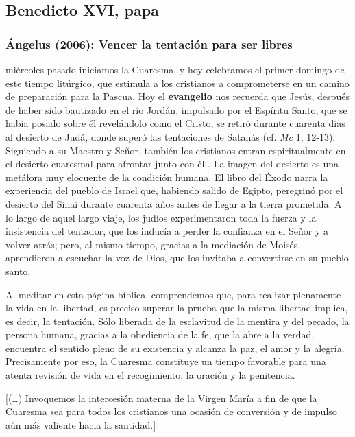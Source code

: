 \newsection
\subsection{Benedicto XVI, papa}

\subsubsection{Ángelus (2006): Vencer la tentación para ser libres}


\begin{body}
 miércoles pasado iniciamos la Cuaresma, y hoy celebramos el primer domingo de este tiempo litúrgico, que estimula a los cristianos a comprometerse en un camino de preparación para la Pascua. Hoy el \textbf{evangelio} nos recuerda que Jesús, después de haber sido bautizado en el río Jordán, impulsado por el Espíritu Santo, que se había posado sobre él revelándolo como el Cristo, se retiró durante cuarenta días al desierto de Judá, donde superó las tentaciones de Satanás (cf. \textit{Mc} 1, 12-13). Siguiendo a su Maestro y Señor, también los cristianos entran espiritualmente en el desierto cuaresmal para afrontar junto con él . La imagen del desierto es una metáfora muy elocuente de la condición humana. El libro del Éxodo narra la experiencia del pueblo de Israel que, habiendo salido de Egipto, peregrinó por el desierto del Sinaí durante cuarenta años antes de llegar a la tierra prometida. A lo largo de aquel largo viaje, los judíos experimentaron toda la fuerza y la insistencia del tentador, que los inducía a perder la confianza en el Señor y a volver atrás; pero, al mismo tiempo, gracias a la mediación de Moisés, aprendieron a escuchar la voz de Dios, que los invitaba a convertirse en su pueblo santo.

Al meditar en esta página bíblica, comprendemos que, para realizar plenamente la vida en la libertad, es preciso superar la prueba que la misma libertad implica, es decir, la tentación. Sólo liberada de la esclavitud de la mentira y del pecado, la persona humana, gracias a la obediencia de la fe, que la abre a la verdad, encuentra el sentido pleno de su existencia y alcanza la paz, el amor y la alegría. Precisamente por eso, la Cuaresma constituye un tiempo favorable para una atenta revisión de vida en el recogimiento, la oración y la penitencia.

[(\ldots) Invoquemos la intercesión materna de la Virgen María a fin de que la Cuaresma sea para todos los cristianos una ocasión de conversión y de impulso aún más valiente hacia la santidad.]
\end{body}


